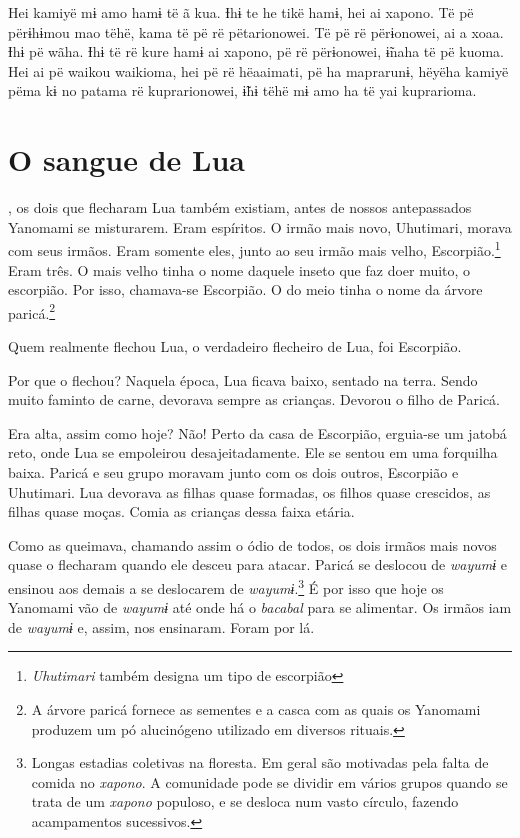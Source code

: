 Hei kamiyë mɨ amo hamɨ të ã kua. Ɨhɨ te he tikë hamɨ, hei ai xapono. Të
pë përɨhɨmou mao tëhë, kama të pë rë pëtarionowei. Të pë rë përɨonowei,
ai a xoaa. Ɨhɨ pë wãha. Ɨhɨ të rë kure hamɨ ai xapono, pë rë përɨonowei,
ɨ̃naha të pë kuoma. Hei ai pë waikou waikioma, hei pë rë hëaaimati, pë ha
maprarunɨ, hëyëha kamiyë pëma kɨ no patama rë kuprarionowei, ɨ̃hɨ tëhë mɨ
amo ha të yai kuprarioma. 

\chapter{O sangue de Lua}
 
, os dois que flecharam Lua também existiam, antes de nossos
antepassados Yanomami se misturarem. Eram espíritos. O irmão mais novo,
Uhutimari, morava com seus irmãos. Eram somente eles, junto ao seu irmão
mais velho, Escorpião.\footnote{\textit{Uhutimari} também designa um tipo de escorpião} Eram três. O mais velho tinha o nome daquele
inseto que faz doer muito, o escorpião. Por isso, chamava-se Escorpião.
O do meio tinha o nome da árvore paricá.\footnote{A árvore paricá fornece as sementes e a casca com as quais os Yanomami
produzem um pó alucinógeno utilizado em diversos rituais.} 

Quem realmente flechou Lua, o verdadeiro flecheiro de Lua, foi
Escorpião. 

Por que o flechou? Naquela época, Lua ficava baixo, sentado na
terra. Sendo muito faminto de carne, devorava sempre as crianças.
Devorou o filho de Paricá. 

Era alta, assim como hoje? Não! Perto da casa de Escorpião, erguia-se um
jatobá reto, onde Lua se empoleirou desajeitadamente. Ele se sentou em
uma forquilha baixa. Paricá e seu grupo moravam junto com os dois
outros, Escorpião e Uhutimari. Lua devorava as filhas quase formadas,
os filhos quase crescidos, as filhas quase moças. Comia as crianças
dessa faixa etária. 

Como as queimava, chamando assim o ódio de todos, os dois irmãos
mais novos quase o flecharam quando ele desceu para
atacar. Paricá se deslocou de \textit{wayumɨ} e ensinou aos
demais a se deslocarem de \textit{wayumɨ}.\footnote{Longas estadias coletivas na floresta. Em geral são motivadas pela falta de comida no \textit{xapono}. A comunidade pode se dividir em vários grupos quando se trata de um \textit{xapono} populoso, e se desloca num vasto círculo, fazendo acampamentos sucessivos.} É por isso que hoje os Yanomami
vão de \textit{wayumɨ} até onde há o \textit{bacabal} para se alimentar. Os irmãos iam
de \textit{wayumɨ} e, assim, nos ensinaram. Foram por lá.

